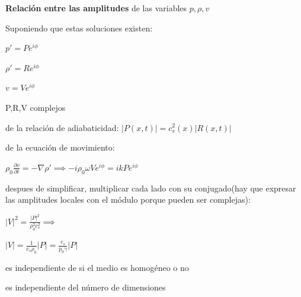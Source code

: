 \documentclass{article}
\begin{document}
\textbf{Relación entre las amplitudes} de las variables $p, \rho, v$ 

\begin{description}  
\item Suponiendo que estas soluciones existen:
\item $p\prime = P e^{i\phi}$
\item $\rho\prime = R e^{i\phi}$
\item $v = V e^{i\phi}$
\item P,R,V  complejos
\item de la relación de adiabaticidad: $|P(x,t)| = c_s^{2}(x) |R(x,t)|$
\item de la ecuación de movimiento: 
\item $\rho_0 \frac{\partial v}{\partial t} = -\nabla \rho\prime \implies -i \rho_0 \omega V e^{i\phi} = i k P e^{i\phi}$
\item despues de simplificar,  multiplicar cada lado con su conjugado(hay que expresar las amplitudes locales con el módulo porque pueden ser complejas):
\item  $|V|^2 = \frac{|P|^2}{\rho_0^{2} c_s^2} \implies$ 
\item $|V|= \frac{1}{c_s \rho_0} |P| = \frac{c_s}{p_0 \gamma} |P|$ 

\item es independiente de si el medio es homogéneo o no 
\item es independiente del número de dimensiones

\end{description}  
\end{document}
